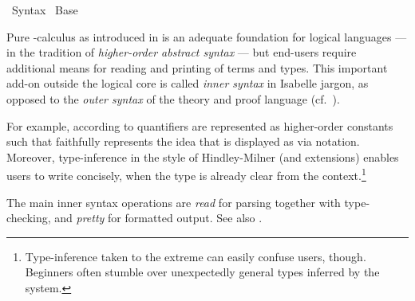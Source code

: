 %
\begin{isabellebody}%
\def\isabellecontext{Syntax}%
%
\isadelimtheory
%
\endisadelimtheory
%
\isatagtheory
{}\isamarkupfalse%
\ Syntax\isanewline
{}\ Base\isanewline
{}%
\endisatagtheory
{\isafoldtheory}%
%
\isadelimtheory
%
\endisadelimtheory
%
\isamarkuptrue%
%
\begin{isamarkuptext}%
Pure -calculus as introduced in  is
  an adequate foundation for logical languages --- in the tradition of
  \emph{higher-order abstract syntax} --- but end-users require
  additional means for reading and printing of terms and types.  This
  important add-on outside the logical core is called \emph{inner
  syntax} in Isabelle jargon, as opposed to the \emph{outer syntax} of
  the theory and proof language (cf.\ \cite{isabelle-isar-ref}).

  For example, according to \cite{church40} quantifiers are
  represented as higher-order constants  such that  faithfully represents
  the idea that is displayed as  via \hyperlink{keyword.binder}{\mbox{}} notation.  Moreover, type-inference in the style of
  Hindley-Milner \cite{hindleymilner} (and extensions) enables users
  to write  concisely, when the type  is
  already clear from the context.\footnote{Type-inference taken to the
  extreme can easily confuse users, though.  Beginners often stumble
  over unexpectedly general types inferred by the system.}

  \medskip The main inner syntax operations are \emph{read} for
  parsing together with type-checking, and \emph{pretty} for formatted
  output.  See also .


\end{isamarkuptext}
\end{isabellebody}
